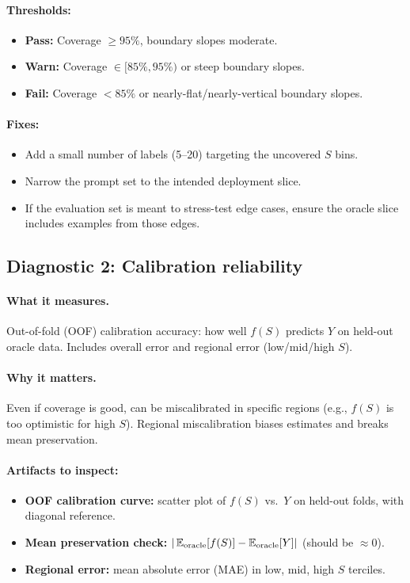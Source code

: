 \begin{enumerate}[resume]
\paragraph{Thresholds:}
\begin{itemize}
\item \textbf{Pass:} Coverage $\ge 95\%$, boundary slopes moderate.
\item \textbf{Warn:} Coverage $\in [85\%, 95\%)$ or steep boundary slopes.
\item \textbf{Fail:} Coverage $< 85\%$ or nearly-flat/nearly-vertical boundary slopes.
\end{itemize}

\paragraph{Fixes:}
\begin{itemize}
\item Add a small number of labels (5--20) targeting the uncovered $S$ bins.
\item Narrow the prompt set to the intended deployment slice.
\item If the evaluation set is meant to stress-test edge cases, ensure the oracle slice includes examples from those edges.
\end{itemize}

\subsection{Diagnostic 2: Calibration reliability}

\paragraph{What it measures.} Out-of-fold (OOF) calibration accuracy: how well $f(S)$ predicts $Y$ on held-out oracle data. Includes overall error and regional error (low/mid/high $S$).

\paragraph{Why it matters.} Even if coverage is good, \autocal{} can be miscalibrated in specific regions (e.g., $f(S)$ is too optimistic for high $S$). Regional miscalibration biases estimates and breaks mean preservation.

\paragraph{Artifacts to inspect:}
\begin{itemize}
\item \textbf{OOF calibration curve:} scatter plot of $f(S)$ vs.\ $Y$ on held-out folds, with diagonal reference.
\item \textbf{Mean preservation check:} $|\operatorname{\mathbb{E}}_{\text{oracle}}[f(S)] - \operatorname{\mathbb{E}}_{\text{oracle}}[Y]|$ (should be $\approx 0$).
\item \textbf{Regional error:} mean absolute error (MAE) in low, mid, high $S$ terciles.
\end{itemize}


\end{enumerate}
